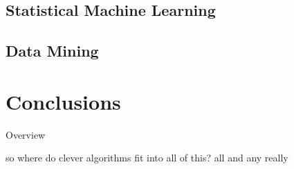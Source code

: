 \documentclass[a4paper, 11pt]{article}
\begin{document}
\subsection{Statistical Machine Learning}

\subsection{Data Mining}


\section{Conclusions}
\label{sec:conclusions}
Overview

so where do clever algorithms fit into all of this?
all and any really




\end{document}
